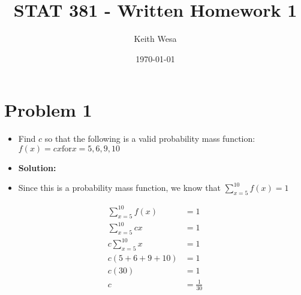 \documentclass{article}
\author{Keith Wesa}
\title{STAT 381 - Written Homework 1}
\date{\today}
\begin{document}
\section{Problem 1}
\begin{itemize}
    \item[] Find $c$ so that the following is a valid probability mass function: $f(x) = cx \text{for} x = 5, 6, 9, 10$
    \item[] \textbf{Solution:}
    \item[] Since this is a probability mass function, we know that $\sum_{x=5}^{10} f(x) = 1$
\end{itemize}
    \begin{align*}
        \sum_{x=5}^{10} f(x) &= 1 \\
        \sum_{x=5}^{10} cx &= 1 \\
        c\sum_{x=5}^{10} x &= 1 \\
        c(5 + 6 + 9 + 10) &= 1 \\
        c(30) &= 1 \\
        c &= \frac{1}{30} \\
    \end{align*}
\end{document}

